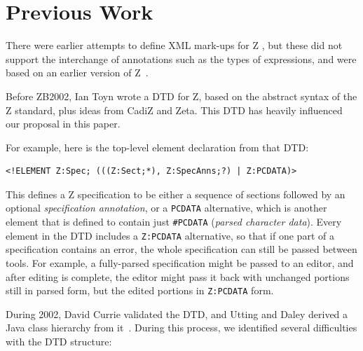 \documentclass{llncs}  %
\newcommand{\AFont}[1]{\texttt{#1}}
\begin{document}
\section{Previous Work}

There were earlier attempts to define XML mark-ups for Z
\cite{Dong01,Wordsworth99,ZEVES???}, but these did not support the
interchange of annotations such as the types of expressions, and were
based on an earlier version of Z~\cite{spivey:z-notation2}.

Before ZB2002, Ian Toyn wrote a DTD for Z, based on the abstract
syntax of the Z standard, plus ideas from CadiZ and Zeta.  This
DTD has heavily influenced our proposal in this paper.

For example, here is the top-level element declaration from that DTD:
\begin{small}
\begin{verbatim}
<!ELEMENT Z:Spec; (((Z:Sect;*), Z:SpecAnns;?) | Z:PCDATA)>
\end{verbatim}
\end{small}

This defines a Z specification to be either a sequence of sections
followed by an optional \emph{specification annotation}, or a
\AFont{PCDATA} alternative, which is another element that is defined 
to contain just \verb!#PCDATA! (\textit{parsed character data}).
Every element in the DTD includes a \AFont{Z:PCDATA} alternative, so
that if one part of a specification contains an error, the whole
specification can still be passed between tools.  For example,
a fully-parsed specification might be passed to an editor, and after
editing is complete, the editor might pass it back with unchanged
portions still in parsed form, but the edited portions in \AFont{Z:PCDATA}
form. 

During 2002, David Currie validated the DTD, and Utting and Daley
derived a Java class hierarchy from it~\cite{daley:report02}.
During this process, we identified several difficulties with the
DTD structure:
\end{document}
